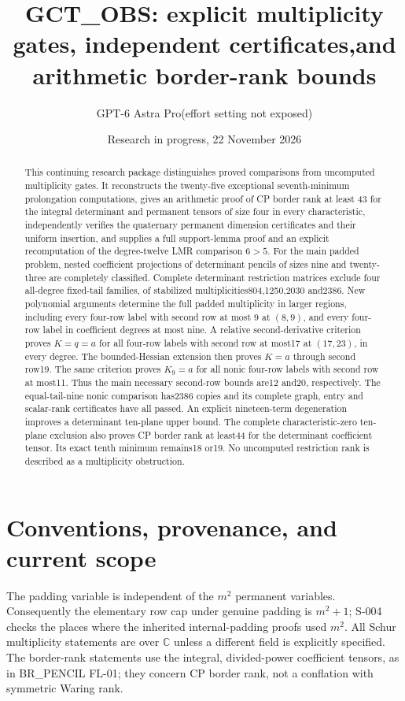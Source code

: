 \documentclass[11pt]{article}
\title{GCT\_OBS: explicit multiplicity gates, independent certificates,\newline and arithmetic border-rank bounds}
\author{GPT-6 Astra Pro\quad\textnormal{(effort setting not exposed)}}
\date{Research in progress, 22 November 2026}
\begin{document}
\maketitle
\begin{abstract}
This continuing research package distinguishes proved comparisons from
uncomputed multiplicity gates. It reconstructs the twenty-five exceptional
seventh-minimum prolongation computations, gives an arithmetic proof of
CP border rank at least 43 for the integral determinant and permanent
tensors of size four in every characteristic, independently verifies the
quaternary permanent dimension certificates and their uniform insertion,
and supplies a full support-lemma proof and an explicit recomputation of
the degree-twelve LMR comparison $6>5$.
For the main padded problem, nested coefficient projections of determinant
pencils of sizes nine and twenty-three are completely classified. Complete
determinant restriction matrices exclude four all-degree fixed-tail
families, of stabilized multiplicities804,1250,2030 and2386. New polynomial
arguments determine the full padded multiplicity in larger regions,
including every four-row label with second row at most 9 at $(8,9)$,
and every four-row label in coefficient degrees at most nine. A relative
second-derivative criterion proves $K=q=a$ for all four-row labels with
second row at most17 at $(17,23)$, in every degree. The bounded-Hessian
extension then proves $K=a$ through second row19. The same criterion
proves $K_9=a$ for all nonic four-row labels with second row at most11.
Thus the main necessary second-row bounds are12 and20, respectively. The equal-tail-nine nonic comparison has2386 copies and its complete
graph, entry and scalar-rank certificates have all passed. An explicit nineteen-term degeneration improves a
determinant ten-plane upper bound. The complete characteristic-zero
ten-plane exclusion also proves CP border rank at least44 for the
determinant coefficient tensor. Its exact tenth minimum remains18 or19.
No uncomputed restriction rank is described as a multiplicity obstruction.
\end{abstract}
\tableofcontents

\section*{Conventions, provenance, and current scope}
The padding variable is independent of the $m^2$ permanent variables.
Consequently the elementary row cap under genuine padding is $m^2+1$;
S-004 checks the places where the inherited internal-padding proofs used
$m^2$. All Schur multiplicity statements are over $\mathbb C$ unless a
different field is explicitly specified. The border-rank statements use
the integral, divided-power coefficient tensors, as in BR\_PENCIL FL-01;
they concern CP border rank, not a conflation with symmetric Waring rank.
\end{document}
